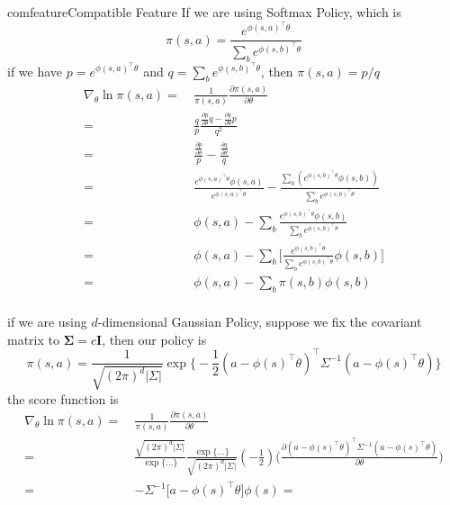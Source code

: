 \documentclass[9pt]{article}
\begin{document}
\begin{topic}{comfeature}{Compatible Feature} 
If we are using Softmax Policy, which is 
\[
\pi(s,a) = \frac{e^{\phi(s,a)^{\top}\theta}}{\sum_{b}e^{\phi(s,b)^{\top}\theta}}
\]
if we have $p = e^{\phi(s,a)^{\top}\theta}$ and $q = \sum_{b}e^{\phi(s,b)^{\top}\theta}$, then $\pi(s,a) = p/q$
\[
\begin{split}
\nabla_{\theta} \ln \pi(s,a) =\ & \frac{1}{\pi(s,a)} \frac{\partial \pi(s,a)}{\partial \theta}\\
=\ & \frac{q}{p} \frac{\frac{\partial p}{\partial \theta} q - \frac{\partial q}{\partial \theta} p}{q^2}\\
=\ & \frac{\frac{\partial p}{\partial \theta}}{p} - \frac{\frac{\partial q}{\partial \theta}}{q}\\
=\ & \frac{e^{\phi(s,a)^{\top}\theta} \phi(s,a)}{e^{\phi(s,a)^{\top}\theta}} - \frac{\sum_{b} (e^{\phi(s,b)^{\top}\theta} \phi(s,b))}{\sum_{b}e^{\phi(s,b)^{\top}\theta}}\\
=\ & \phi(s,a) - \sum_{b} \frac{e^{\phi(s,b)^{\top}\theta} \phi(s,b)}{\sum_{b}e^{\phi(s,b)^{\top}\theta}}\\
=\ & \phi(s,a) - \sum_{b} \big[\frac{e^{\phi(s,b)^{\top}\theta}}{\sum_{b}e^{\phi(s,b)^{\top}\theta}} \phi(s,b)\big]\\
=\ & \phi(s,a) - \sum_{b} \pi(s,b) \phi(s,b)\\
\end{split}
\]

if we are using $d$-dimensional Gaussian Policy, suppose we fix the covariant matrix to $\mathbf{\Sigma} = c\mathbf{I}$, then our policy is 
\[
\pi(s,a) = \frac{1}{\sqrt{(2 \pi)^{d} |\Sigma|}} \exp\big\{ -\frac{1}{2} (a-\phi(s)^\top\theta)^\top\Sigma^{-1}(a-\phi(s)^\top\theta)\big\}
\]
the score function is 
\[
\begin{split}
\nabla_{\theta} \ln \pi(s,a) =\ & \frac{1}{\pi(s,a)} \frac{\partial \pi(s,a)}{\partial \theta}\\
=\ & \frac{\sqrt{(2 \pi)^d |\Sigma|}}{\exp\big \{ \ldots \big \}}  \frac{\exp\big \{ \ldots \big \}}{\sqrt{(2 \pi)^d |\Sigma|}} (-\frac{1}{2}) \big( \frac{\partial (a-\phi(s)^\top\theta)^\top\Sigma^{-1}(a-\phi(s)^\top\theta)}{\partial \theta}\big)\\
=\ & -\Sigma^{-1} \big[a-\phi(s)^\top \theta \big] \phi(s) 
=
\end{split}
\]
\end{topic}
\end{document}
